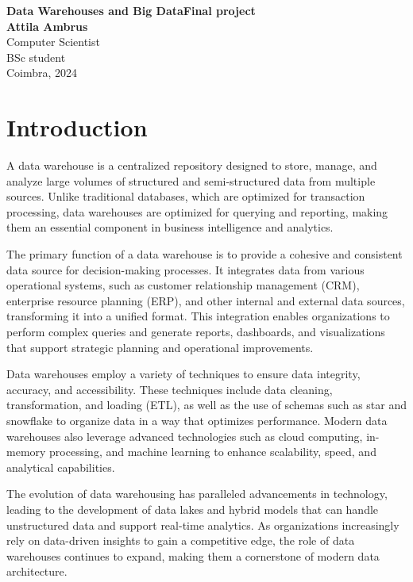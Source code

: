 \documentclass[12pt]{report}
\begin{document}
\thispagestyle{empty}
\begin{center}

{\Huge\bf Data Warehouses and Big Data\newline Final project}\\
\vspace{2.5cm}
{\Large\bf Attila Ambrus} \\
\vspace{0.5cm}
{\small Computer Scientist\\BSc student}\\
\vspace{1cm}
Coimbra, 2024
\vspace{1.5cm}


\end{center}


\thispagestyle{empty}
\clearpage
{}

\chapter{Introduction}
A data warehouse is a centralized repository designed to store, manage, and analyze large volumes of structured and semi-structured data from multiple sources. Unlike traditional databases, which are optimized for transaction processing, data warehouses are optimized for querying and reporting, making them an essential component in business intelligence and analytics.

The primary function of a data warehouse is to provide a cohesive and consistent data source for decision-making processes. It integrates data from various operational systems, such as customer relationship management (CRM), enterprise resource planning (ERP), and other internal and external data sources, transforming it into a unified format. This integration enables organizations to perform complex queries and generate reports, dashboards, and visualizations that support strategic planning and operational improvements.

Data warehouses employ a variety of techniques to ensure data integrity, accuracy, and accessibility. These techniques include data cleaning, transformation, and loading (ETL), as well as the use of schemas such as star and snowflake to organize data in a way that optimizes performance. Modern data warehouses also leverage advanced technologies such as cloud computing, in-memory processing, and machine learning to enhance scalability, speed, and analytical capabilities.

The evolution of data warehousing has paralleled advancements in technology, leading to the development of data lakes and hybrid models that can handle unstructured data and support real-time analytics. As organizations increasingly rely on data-driven insights to gain a competitive edge, the role of data warehouses continues to expand, making them a cornerstone of modern data architecture.
\end{document}
